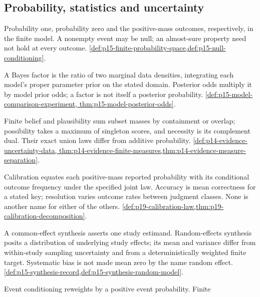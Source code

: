 \subsection{Probability, statistics and uncertainty}
\label{sec:p14-glossary-probability}

\begin{description}[style=nextline,leftmargin=0pt]
\item[Almost surely; null event; support.]
Probability one, probability zero and the positive-mass outcomes,
respectively, in the finite model. A nonempty event may be null; an
almost-sure property need not hold at every outcome.
\cref{def:p15-finite-probability-space,def:p15-null-conditioning}.
\item[Bayes factor; posterior model odds.]
A Bayes factor is the ratio of two marginal data densities, integrating
each model's proper parameter prior on the stated domain. Posterior odds
multiply it by model prior odds; a factor is not itself a posterior
probability. \cref{def:p15-model-comparison-experiment,
thm:p15-model-posterior-odds}.
\item[Belief function; plausibility; possibility; necessity.]
Finite belief and plausibility sum subset masses by containment or overlap;
possibility takes a maximum of singleton scores, and necessity is its
complement dual. Their exact union laws differ from additive probability.
\cref{def:p14-evidence-uncertainty-data,
thm:p14-evidence-finite-measures,thm:p14-evidence-measure-separation}.
\item[Calibration; accuracy; resolution.]
Calibration equates each positive-mass reported probability with its
conditional outcome frequency under the specified joint law. Accuracy
is mean correctness for a stated key; resolution varies outcome rates
between judgment classes. None is another name for either of the others.
\cref{def:p19-calibration-law,thm:p19-calibration-decomposition}.
\item[Common effect; random effects; heterogeneity.]
A common-effect synthesis asserts one study estimand. Random-effects
synthesis posits a distribution of underlying study effects; its mean and
variance differ from within-study sampling uncertainty and from a
deterministically weighted finite target. Systematic bias is not made
mean zero by the name random effect.
\cref{def:p15-synthesis-record,def:p15-synthesis-random-model}.
\item[Conditional probability; conditional expectation.]
Event conditioning reweights by a positive event probability. Finite

\end{description}
